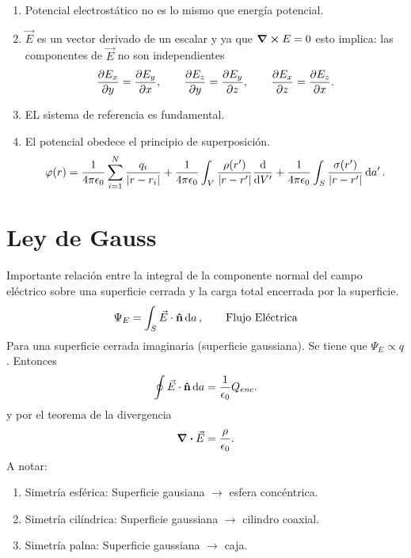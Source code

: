 \begin{enumerate}
	\item Potencial electrostático no es lo mismo que energía potencial.
	\item $\vec{E}$ es un vector derivado de un escalar y ya que $\curl{E} = 0$ esto implica: las componentes de $\vec{E}$ no son independientes
	\begin{equation}
		\pdv{E_x}{y} = \pdv{E_y}{x}, \qquad \pdv{E_z}{y} = \pdv{E_y}{z}, \qquad \pdv{E_x}{z} = \pdv{E_z}{x}.
	\end{equation}
	\item EL sistema de referencia es fundamental.
	\item El potencial obedece el principio de superposición.
	\begin{equation}
		\varphi (r) = \frac{1}{4\pi \epsilon_0} \sum_{i=1} ^N \frac{q_i}{\abs{r - r_i}} + \frac{1}{4\pi \epsilon_0} \int _V \frac{\rho (r')}{\abs{r-r'}} \dv{V'} + \frac{1}{4\pi \epsilon_0} \int _S \frac{\sigma (r')}{\abs{r - r'}} \dd{a'}.
	\end{equation}
\end{enumerate}

\section{Ley de Gauss}
Importante relación entre la integral de la componente normal del campo eléctrico sobre una superficie cerrada y la carga total encerrada por la superficie.
\begin{equation}
	\Psi _E = \int _S \vec{E} \cdot \vu{n} \dd{a}, \qquad \text{Flujo Eléctrica}
\end{equation}
Para una superficie cerrada imaginaria (superficie gaussiana). Se tiene que $\Psi _E \propto q$. Entonces
\begin{equation}
	\oint \vec{E} \cdot \vu{n} \dd{a} = \frac{1}{\epsilon_0} Q_{enc}.
\end{equation}
y por el teorema de la divergencia
\begin{equation}
	\div{\vec{E}} = \frac{\rho}{\epsilon_0}.
\end{equation}
A notar:
\begin{enumerate}
	\item Simetría esférica: Superficie gausiana $\to$ esfera concéntrica.
	\item Simetría cilíndrica: Superficie gaussiana $\to$ cilindro coaxial.
	\item Simetría palna: Superficie gaussiana $\to$ caja.
\end{enumerate}



